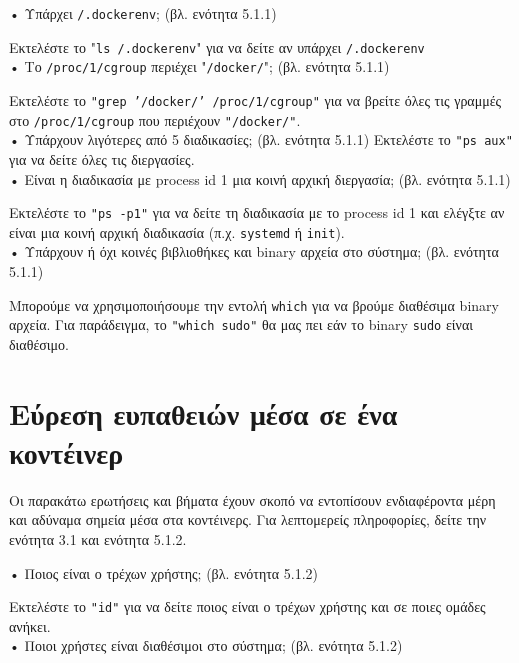 • Υπάρχει \texttt{\textlatin{/.dockerenv}}; (βλ. ενότητα 5.1.1)

Εκτελέστε το "\texttt{\textlatin{ls /.dockerenv}}" για να δείτε αν υπάρχει
\texttt{\textlatin{/.dockerenv}} \\

• Το \texttt{\textlatin{/proc/1/cgroup}} περιέχει
"\texttt{\textlatin{/docker/}}"; (βλ. ενότητα 5.1.1)

Εκτελέστε το \texttt{\textlatin{"grep '/docker/' /proc/1/cgroup"}} για να βρείτε
όλες τις γραμμές στο \texttt{\textlatin{/proc/1/cgroup}} που περιέχουν
\texttt{\textlatin{"/docker/"}}. \\

• Υπάρχουν λιγότερες από 5 διαδικασίες; (βλ. ενότητα 5.1.1)
Εκτελέστε το \texttt{\textlatin{"ps aux"}} για να δείτε όλες τις διεργασίες.\\

• Είναι η διαδικασία με \textlatin{process id} 1 μια κοινή αρχική διεργασία;
(βλ. ενότητα 5.1.1)

Εκτελέστε το \texttt{\textlatin{"ps -p1"}} για να δείτε τη διαδικασία με το
\textlatin{process id} 1 και ελέγξτε αν είναι μια κοινή αρχική διαδικασία
(π.χ. \texttt{\textlatin{systemd}} ή \texttt{\textlatin{init}}). \\

• Υπάρχουν ή όχι κοινές βιβλιοθήκες και \textlatin{binary} αρχεία στο σύστημα;
(βλ. ενότητα 5.1.1)

Μπορούμε να χρησιμοποιήσουμε την εντολή \texttt{\textlatin{which}} για να βρούμε
διαθέσιμα \textlatin{binary} αρχεία. Για παράδειγμα, το
\texttt{\textlatin{"which sudo"}} θα μας πει εάν το \textlatin{binary}
\texttt{\textlatin{sudo}} είναι διαθέσιμο.

\section{Εύρεση ευπαθειών μέσα σε ένα κοντέινερ}

Οι παρακάτω ερωτήσεις και βήματα έχουν σκοπό να εντοπίσουν ενδιαφέροντα μέρη
και αδύναμα σημεία μέσα στα κοντέινερς. Για λεπτομερείς πληροφορίες, δείτε την
ενότητα 3.1 και ενότητα 5.1.2.

• Ποιος είναι ο τρέχων χρήστης; (βλ. ενότητα 5.1.2)

Εκτελέστε το \texttt{\textlatin{"id"}} για να δείτε ποιος είναι ο τρέχων χρήστης
και σε ποιες ομάδες ανήκει. \\

• Ποιοι χρήστες είναι διαθέσιμοι στο σύστημα; (βλ. ενότητα 5.1.2)

